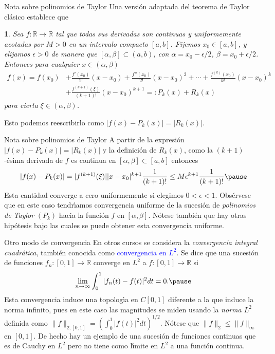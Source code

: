 \documentclass[xcolor=dvipsnames,10pt,handout, draft]{beamer}
\newcommand{\rz}{\mathbb R}
\newtheorem*{afirma}{}
\begin{document}
\begin{frame}{Nota sobre polinomios de Taylor}\pause
Una versi\'on adaptada del teorema de Taylor cl\'asico establece que 
\begin{afirma}
Sea $f:\rz\to\rz$ tal que todas sus derivadas son continuas y uniformemente acotadas por $M>0$ en un intervalo compacto $[a,b]$. \pause Fijemos $x_0\in[a,b]$, y elijamos $\epsilon>0$ de manera que $[\alpha,\beta]\subset(a,b)$, con $\alpha=x_0-\epsilon/2$, $\beta=x_0+\epsilon/2$. \pause Entonces para cualquier $x\in(\alpha,\beta)$
\begin{align*}
f(x)=f(x_0)&+\frac{f'(x_0)}{1!}(x-x_0)+\frac{f''(x_0)}{2!}(x-x_0)^2+\cdots+\frac{f^{(k)}(x_0)}{k!}(x-x_0)^{k}\\
&+\frac{f^{(k+1)}(\xi)}{(k+1)!}(x-x_0)^{k+1}=:P_{k}(x)+R_k(x)
\end{align*}
\pause para cierta $\xi\in(\alpha,\beta)$.
\end{afirma}
\pause Esto podemos reescribirlo como $|f(x)-P_{k}(x)|=|R_{k}(x)|$. 
\end{frame}

\begin{frame}{Nota sobre polinomios de Taylor}
A partir de la expresi\'on $|f(x)-P_{k}(x)|=|R_{k}(x)|$ y la definici\'on de $R_k(x)$, como la $(k+1)$-\'esima derivada de $f$ es continua en $[\alpha,\beta]\subset[a,b]$ entonces 
$$|f(x)-P_{k}(x)|=|f^{(k+1)}(\xi)||x-x_0|^{k+1}\frac{1}{(k+1)!}\leq M\epsilon^{k+1}\frac{1}{(k+1)!}\pause$$
Esta cantidad converge a cero uniformemente si elegimos $0<\epsilon<1$.
\pause\vskip6pt
Obs\'ervese que en este caso tendr\'\i amos convergencia uniforme de la sucesi\'on de {\em polinomios de Taylor} $(P_k)$ hacia la funci\'on $f$ en $[\alpha,\beta]$. 
\pause\vskip6pt
N\'otese tambi\'en que hay otras hip\'otesis bajo las cuales se puede obtener esta convergencia uniforme.
\end{frame}


\begin{frame}{Otro modo de convergencia}
En otros cursos se considera la {\em convergencia integral cuadr\'atica},  tambi\'en conocida como \textcolor{blue}{convergencia en $L^2$}.
\vskip6pt\pause
Se dice que una sucesi\'on de funciones $f_n:[0,1]\to\rz$ converge en $L^2$ a $f:[0,1]\to\rz$ si 
$$\lim_{n\to\infty}\int_0^1|f_n(t)-f(t)|^2dt=0.\pause$$
Esta convergencia induce una topolog\'\i a en $C[0,1]$ diferente a la que induce la norma infinito, pues en este caso las magnitudes se miden usando la {\em norma $L^2$} definida como $\displaystyle\|f\|_{2,[0,1]}=\left(\int_0^1|f(t)|^2dt\right)^{1/2}$. \pause N\'otese que $\|f\|_{2}\leq\|f\|_{\infty}$ en $[0,1]$.
\vskip6pt\pause
De hecho hay un ejemplo de una sucesi\'on de funciones continuas que es de Cauchy en $L^2$ pero no tiene como l\'\i mite en $L^2$ a una funci\'on continua. 
\end{frame}
\end{document}

